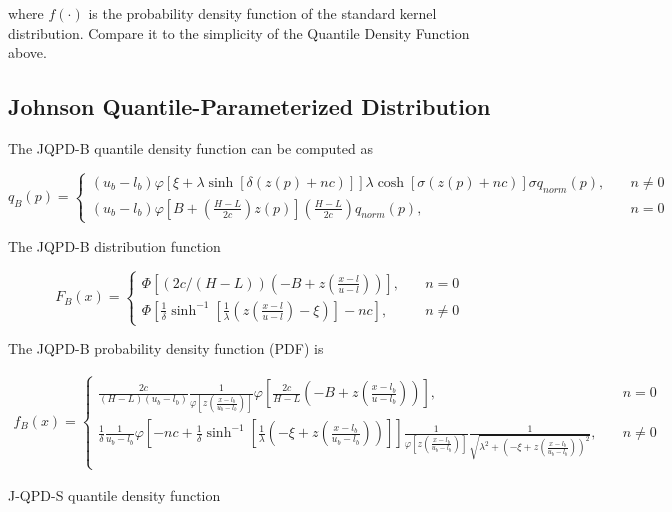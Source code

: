 \documentclass[
  letterpaper,
  DIV=11,
  numbers=noendperiod]{scrartcl}
\begin{document}
where \(f(\cdot)\) is the probability density function of the standard
kernel distribution. Compare it to the simplicity of the Quantile
Density Function above.

\subsection*{Johnson Quantile-Parameterized
Distribution}\label{johnson-quantile-parameterized-distribution}

The JQPD-B quantile density function can be computed as

\[
q_B(p)=\begin{cases}
(u_b-l_b)\varphi[\xi+\lambda\sinh[\delta(z(p)+nc)]]\lambda\cosh[\sigma(z(p)+nc)] \sigma q_{norm}(p), \quad &n\neq 0\\
(u_b-l_b)\varphi\left[B+\left(\frac{H-L}{2c}\right)z(p)\right]\left(\frac{H-L}{2c}\right)q_{norm}(p), \quad &n=0
\end{cases}
\]

The JQPD-B distribution function

\[
F_B(x)=\begin{cases}
\Phi\left[(2c/(H-L))(-B+z\left(\frac{x-l}{u-l}\right))\right], \quad &n=0 \\
\Phi\left[\frac{1}{\delta}\sinh^{-1}\left[\frac{1}{\lambda}\left(z\left(\frac{x-l}{u-l}\right)-\xi\right)\right]-nc\right], \quad &n\neq0
\end{cases}
\]

The JQPD-B probability density function (PDF) is

\[
\begin{gathered}
f_B(x)=\begin{cases}
\frac{2c}{(H-L)(u_b-l_b)}\frac{1}{\varphi\left[z\left(\frac{x-l_b}{u_b-l_b}\right)\right]}\varphi\left[\frac{2c}{H-L}\left(-B+z\left(\frac{x-l_b}{u-l_b}\right)\right)\right], \quad &n=0\\
\frac{1}{\delta}\frac{1}{u_b-l_b}\varphi\left[-nc+\frac{1}{\delta}\sinh^{-1}\left[\frac{1}{\lambda}\left(-\xi+z\left(\frac{x-l_b}{u_b-l_b}\right)\right)\right]\right] \frac{1}{\varphi\left[z\left(\frac{x-l_b}{u_b-l_b}\right)\right]}\frac{1}{\sqrt{\lambda^2+\left(-\xi+z\left(\frac{x-l_b}{u_b-l_b}\right)\right)^2}}, \quad &n\neq 0\\
\end{cases}
\end{gathered}
\]

J-QPD-S quantile density function
\end{document}
